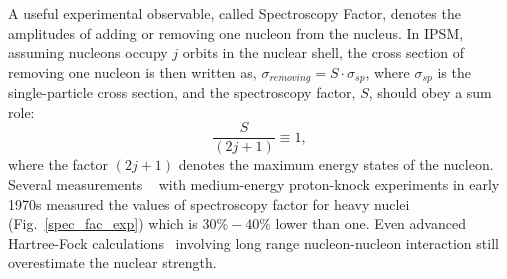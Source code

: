 A useful experimental observable, called Spectroscopy Factor, denotes the amplitudes of adding or removing one nucleon from the nucleus. In IPSM, assuming nucleons occupy $j$ orbits in the nuclear shell, the cross section of removing one nucleon is then written as, $\sigma_{removing} = S\cdot\sigma_{sp}$, where $\sigma_{sp}$ is the single-particle cross section, and the spectroscopy factor, $S$, should obey a sum role:
\begin{equation}
  \frac{S}{(2j+1)} \equiv 1,
\end{equation} 
where the factor $(2j+1)$ denotes the maximum energy states of the nucleon. Several measurements ~\cite{Lapikas1993297,Kelly:1996hd} with medium-energy proton-knock experiments in early 1970s measured the values of spectroscopy factor for heavy nuclei (Fig.~\ref{spec_fac_exp}) which is $30\%-40\%$ lower than one. Even advanced Hartree-Fock calculations~\cite{hartree_fock_book} involving long range nucleon-nucleon interaction still overestimate the nuclear strength.
